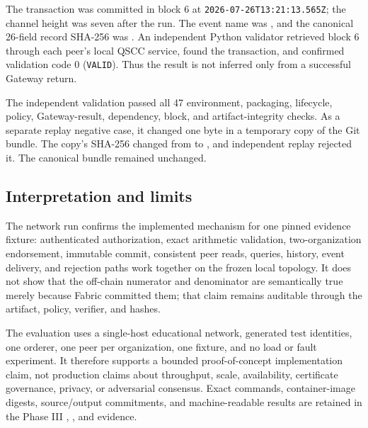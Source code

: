 The transaction was committed in block 6 at \texttt{2026-07-26T13:21:13.565Z}; the channel height was seven after the
run. The event name was , and the canonical 26-field record SHA-256 was
. An independent Python validator
retrieved block 6 through each peer's local QSCC service, found the transaction, and confirmed validation code 0
(\texttt{VALID}). Thus the result is not inferred only from a successful Gateway return.

The independent validation passed all 47 environment, packaging, lifecycle, policy, Gateway-result, dependency, block, and
artifact-integrity checks. As a separate replay negative case, it changed one byte in a temporary copy of the Git bundle. The
copy's SHA-256 changed from
 to
, and independent replay rejected it.
The canonical bundle remained unchanged.

\subsection{Interpretation and limits}
\label{sec:phase3_fabric_interpretation}

The network run confirms the implemented mechanism for one pinned evidence fixture: authenticated authorization, exact
arithmetic validation, two-organization endorsement, immutable commit, consistent peer reads, queries, history, event
delivery, and rejection paths work together on the frozen local topology. It does not show that the off-chain numerator and
denominator are semantically true merely because Fabric committed them; that claim remains auditable through the artifact,
policy, verifier, and hashes.

The evaluation uses a single-host educational network, generated test identities, one orderer, one peer per organization,
one fixture, and no load or fault experiment. It therefore supports a bounded proof-of-concept implementation claim, not production
claims about throughput, scale, availability, certificate governance, privacy, or adversarial consensus. Exact commands,
container-image digests, source/output commitments, and machine-readable results are retained in the Phase III
, , and  evidence.
